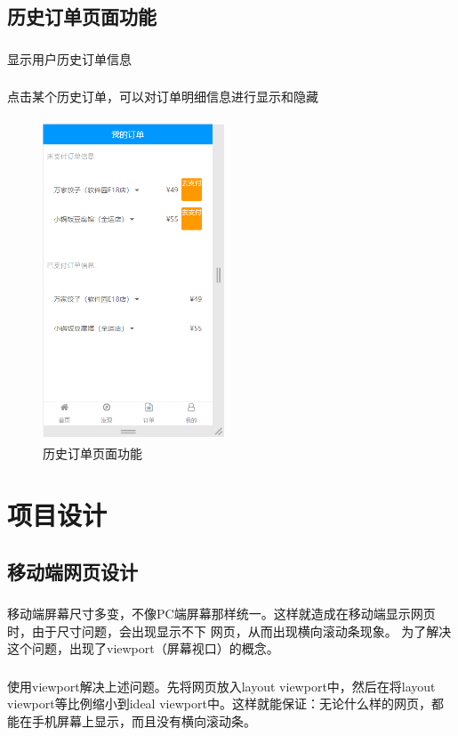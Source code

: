 \subsection{历史订单页面功能}
\subsubsection*{}
显示用户历史订单信息
\subsubsection*{}
点击某个历史订单，可以对订单明细信息进行显示和隐藏
\begin{figure}[H]
    \centering
    \includegraphics[width=5.4cm,height=9.6cm]{figures/2.2.8.png}
    \caption{历史订单页面功能}
\end{figure}

\section{项目设计}
\subsection{移动端网页设计}
\subsubsection*{}
移动端屏幕尺寸多变，不像PC端屏幕那样统一。这样就造成在移动端显示网页时，由于尺寸问题，会出现显示不下
网页，从而出现横向滚动条现象。 为了解决这个问题，出现了viewport（屏幕视口）的概念。
\subsubsection*{}
使用viewport解决上述问题。先将网页放入layout viewport中，然后在将layout viewport等比例缩小到ideal viewport中。这样就能保证：无论什么样的网页，都能在手机屏幕上显示，而且没有横向滚动条。

